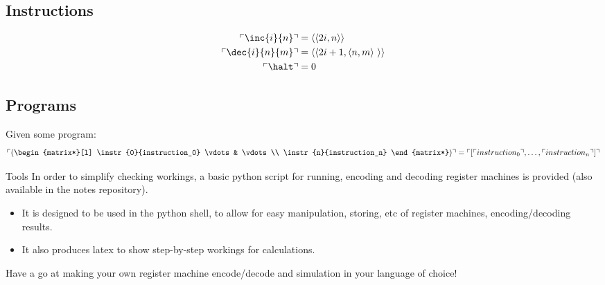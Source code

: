 \subsection{Instructions}
\[\begin{split}
		\ulcorner \inc{i}{n} \urcorner &= \langle\langle 2i, n \rangle\rangle \\
		\ulcorner \dec{i}{n}{m} \urcorner &= \langle\langle 2i + 1, \langle n,m \rangle \  \rangle\rangle \\
		\ulcorner \halt \urcorner &= 0 \\
	\end{split}\]
\subsection{Programs}
Given some program:
\[\ulcorner \left( \begin{matrix*}[l]
			\instr{0}{instruction_0}
			\vdots & \vdots \\
			\instr{n}{instruction_n}
		\end{matrix*} \right) \urcorner = \ulcorner [\ulcorner instruction_0 \urcorner, \dots, \ulcorner instruction_n \urcorner] \urcorner\]

\begin{sidenotebox}{Tools}
	In order to simplify checking workings, a basic python script for running, encoding and decoding register machines is provided (also available in the notes repository).
	\begin{itemize}
		\item It is designed to be used in the python shell, to allow for easy manipulation, storing, etc of register machines, encoding/decoding results.
		\item It also produces latex to show step-by-step workings for calculations.
	\end{itemize}
	Have a go at making your own register machine encode/decode and simulation in your language of choice!
\end{sidenotebox}
